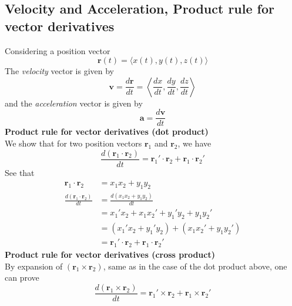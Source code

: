 \documentclass{report}
\begin{document}
\subsection{Velocity and Acceleration, Product rule for vector derivatives} %
Considering a position vector
\begin{equation*}
\bm{r}(t)=\langle x(t),y(t),z(t)\rangle
\end{equation*}
The \textit{velocity} vector is given by
\begin{equation*}
\bm{v}=\frac{d\bm{r}}{dt}=\left\langle
\frac{dx}{dt},\frac{dy}{dt},\frac{dz}{dt}\right\rangle
\end{equation*}
and the \textit{acceleration} vector is given by 
\begin{equation*}
\bm{a}=\frac{d\bm{v}}{dt}
\end{equation*}
\textbf{Product rule for vector derivatives (dot product)}\\
We show that for two position vectors $\bm{r}_1$ and $\bm{r}_2$, we have
\begin{equation*}
\frac{d(\bm{r}_1\cdot\bm{r}_2)}{dt}=
\bm{r}_1'\cdot\bm{r}_2+\bm{r}_1\cdot\bm{r}_2'
\end{equation*}
See that
\begin{align*}
\bm{r}_1\cdot\bm{r}_2&=x_1x_2+y_1y_2\\
\frac{d(\bm{r}_1\cdot\bm{r}_2)}{dt}&=
\frac{d(x_1x_2+y_1y_2)}{dt}\\
&=x_1'x_2+x_1x_2'+y_1'y_2+y_1y_2'\\
&=(x_1'x_2+y_1'y_2)+(x_1x_2'+y_1y_2')\\
&=\bm{r}_1'\cdot\bm{r}_2+\bm{r}_1\cdot\bm{r}_2'
\end{align*}
\textbf{Product rule for vector derivatives (cross product)}\\
By expansion of $(\bm{r}_1\times\bm{r}_2)$, same as in the case of the dot product above, one can prove
\begin{equation*}
\frac{d(\bm{r}_1\times\bm{r}_2)}{dt}=
\bm{r}_1'\times\bm{r}_2+\bm{r}_1\times\bm{r}_2'
\end{equation*}
\newpage
\end{document}
